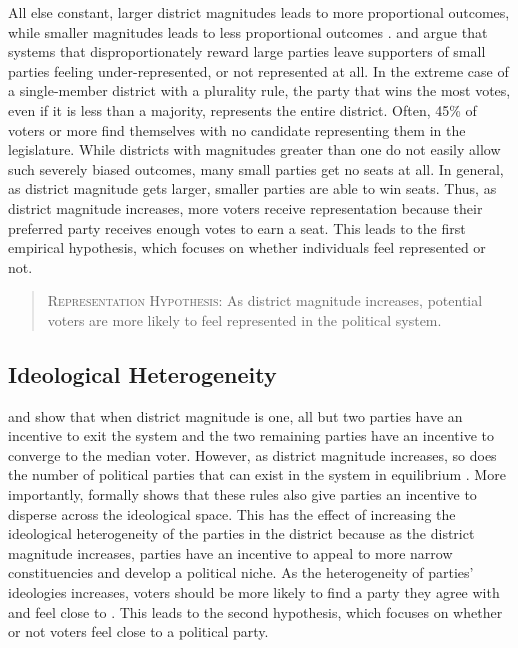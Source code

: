 \documentclass[12pt]{article}
\begin{document}
All else constant, larger district magnitudes leads to more proportional outcomes, while smaller magnitudes leads to less proportional outcomes \citep{Cox1997, Benoit2000}. \cite{Banduccietal1999} and \cite{BowlerLanoue1992} argue that systems that disproportionately reward large parties leave supporters of small parties feeling under-represented, or not represented at all. In the extreme case of a single-member district with a plurality rule, the party that wins the most votes, even if it is less than a majority, represents the entire district. Often, 45\% of voters or more find themselves with no candidate representing them in the legislature. While districts with magnitudes greater than one do not easily allow such severely biased outcomes, many small parties get no seats at all. In general, as district magnitude gets larger, smaller parties are able to win seats. Thus, as district magnitude increases, more voters receive representation because their preferred party receives enough votes to earn a seat. This leads to the first empirical hypothesis, which focuses on whether individuals feel represented or not.

\begin{quote}
        \textsc{Representation Hypothesis:} As district magnitude increases, potential voters are more likely to feel represented in the political system.
\end{quote}

\subsection*{Ideological Heterogeneity}

\cite{Downs1957} and \cite{Cox1999b} show that when district magnitude is one, all but two parties have an incentive to exit the system and the two remaining parties have an incentive to converge to the median voter. However, as district magnitude increases, so does the number of political parties that can exist in the system in equilibrium \citep{Cox1997, Cox1999, ClarkGolder2006}. More importantly, \cite{Cox1990} formally shows that these rules also give parties an incentive to disperse across the ideological space. This has the effect of increasing the ideological heterogeneity of the parties in the district because as the district magnitude increases, parties have an incentive to appeal to more narrow constituencies and develop a political niche. As the heterogeneity of parties' ideologies increases, voters should be more likely to find a party they agree with and feel close to \citep{Bowleretal1994}. This leads to the second hypothesis, which focuses on whether or not voters feel close to a political party.
\end{document}
